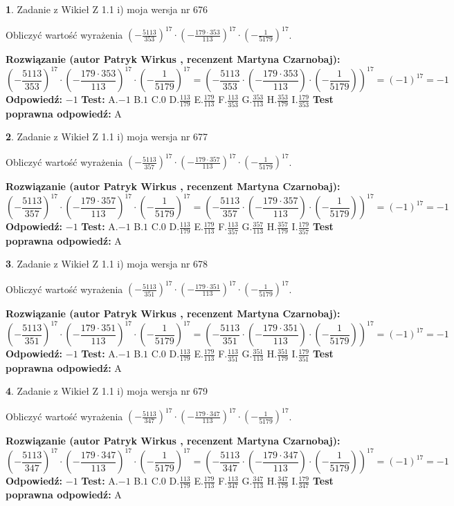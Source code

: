 \documentclass[12pt, a4paper]{article}
\theoremstyle{definition} %
\newtheorem{zad}{}
\newcommand{\zadStart}[1]{\begin{zad}#1\newline}
\newcommand{\zadStop}{\end{zad}}
\newcommand{\rozwStart}[2]{\noindent \textbf{Rozwiązanie (autor #1 , recenzent #2): }\newline}
\newcommand{\rozwStop}{\newline}
\newcommand{\odpStart}{\noindent \textbf{Odpowiedź:}\newline}
\newcommand{\odpStop}{\newline}
\newcommand{\testStart}{\noindent \textbf{Test:}\newline}
\newcommand{\testStop}{\newline}
\newcommand{\kluczStart}{\noindent \textbf{Test poprawna odpowiedź:}\newline}
\newcommand{\kluczStop}{\newline}
\begin{document}
\zadStart{Zadanie z Wikieł Z 1.1 i) moja wersja nr 676}

Obliczyć wartość wyrażenia $(-\frac{5113}{353})^{17} \cdot (-\frac{179 \cdot 353}{113})^{17} \cdot (-\frac{1}{5179})^{17}$.
\zadStop
\rozwStart{Patryk Wirkus}{Martyna Czarnobaj}
$$(-\frac{5113}{353})^{17} \cdot (-\frac{179 \cdot 353}{113})^{17} \cdot (-\frac{1}{5179})^{17} = (-\frac{5113}{353} \cdot (-\frac{179 \cdot 353}{113}) \cdot (-\frac{1}{5179}))^{17} = (-1)^{17} = -1$$
\rozwStop
\odpStart
$-1$
\odpStop
\testStart
A.$-1$ B.$1$ C.$0$ D.$\frac{113}{179}$ E.$\frac{179}{113}$
F.$\frac{113}{353}$ G.$\frac{353}{113}$
H.$\frac{353}{179}$
I.$\frac{179}{353}$
\testStop
\kluczStart
A
\kluczStop



\zadStart{Zadanie z Wikieł Z 1.1 i) moja wersja nr 677}

Obliczyć wartość wyrażenia $(-\frac{5113}{357})^{17} \cdot (-\frac{179 \cdot 357}{113})^{17} \cdot (-\frac{1}{5179})^{17}$.
\zadStop
\rozwStart{Patryk Wirkus}{Martyna Czarnobaj}
$$(-\frac{5113}{357})^{17} \cdot (-\frac{179 \cdot 357}{113})^{17} \cdot (-\frac{1}{5179})^{17} = (-\frac{5113}{357} \cdot (-\frac{179 \cdot 357}{113}) \cdot (-\frac{1}{5179}))^{17} = (-1)^{17} = -1$$
\rozwStop
\odpStart
$-1$
\odpStop
\testStart
A.$-1$ B.$1$ C.$0$ D.$\frac{113}{179}$ E.$\frac{179}{113}$
F.$\frac{113}{357}$ G.$\frac{357}{113}$
H.$\frac{357}{179}$
I.$\frac{179}{357}$
\testStop
\kluczStart
A
\kluczStop



\zadStart{Zadanie z Wikieł Z 1.1 i) moja wersja nr 678}

Obliczyć wartość wyrażenia $(-\frac{5113}{351})^{17} \cdot (-\frac{179 \cdot 351}{113})^{17} \cdot (-\frac{1}{5179})^{17}$.
\zadStop
\rozwStart{Patryk Wirkus}{Martyna Czarnobaj}
$$(-\frac{5113}{351})^{17} \cdot (-\frac{179 \cdot 351}{113})^{17} \cdot (-\frac{1}{5179})^{17} = (-\frac{5113}{351} \cdot (-\frac{179 \cdot 351}{113}) \cdot (-\frac{1}{5179}))^{17} = (-1)^{17} = -1$$
\rozwStop
\odpStart
$-1$
\odpStop
\testStart
A.$-1$ B.$1$ C.$0$ D.$\frac{113}{179}$ E.$\frac{179}{113}$
F.$\frac{113}{351}$ G.$\frac{351}{113}$
H.$\frac{351}{179}$
I.$\frac{179}{351}$
\testStop
\kluczStart
A
\kluczStop



\zadStart{Zadanie z Wikieł Z 1.1 i) moja wersja nr 679}

Obliczyć wartość wyrażenia $(-\frac{5113}{347})^{17} \cdot (-\frac{179 \cdot 347}{113})^{17} \cdot (-\frac{1}{5179})^{17}$.
\zadStop
\rozwStart{Patryk Wirkus}{Martyna Czarnobaj}
$$(-\frac{5113}{347})^{17} \cdot (-\frac{179 \cdot 347}{113})^{17} \cdot (-\frac{1}{5179})^{17} = (-\frac{5113}{347} \cdot (-\frac{179 \cdot 347}{113}) \cdot (-\frac{1}{5179}))^{17} = (-1)^{17} = -1$$
\rozwStop
\odpStart
$-1$
\odpStop
\testStart
A.$-1$ B.$1$ C.$0$ D.$\frac{113}{179}$ E.$\frac{179}{113}$
F.$\frac{113}{347}$ G.$\frac{347}{113}$
H.$\frac{347}{179}$
I.$\frac{179}{347}$
\testStop
\kluczStart
A
\kluczStop
\end{document}
